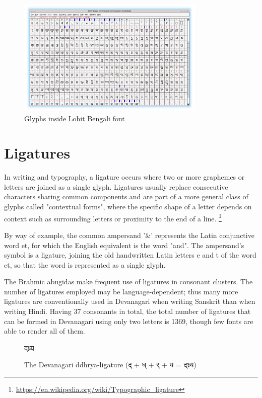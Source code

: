 \begin{figure}[h]
    \centering
    \includegraphics[width=0.8\textwidth]{images/glyph-fontforge-lohit-bengali.png}
    \caption{Glyphs inside Lohit Bengali font}
\end{figure}

\section{Ligatures }

In writing and typography, a ligature occurs where two or more graphemes or
letters are joined as a single glyph. Ligatures usually replace consecutive
characters sharing common components and are part of a more general class of
glyphs called "contextual forms", where the specific shape of a letter depends
on context such as surrounding letters or proximity to the end of a line.
\footnote{\url{https://en.wikipedia.org/wiki/Typographic_ligature}}

By way of example, the common ampersand '\&' represents the Latin conjunctive
word et, for which the English equivalent is the word "and". The ampersand's
symbol is a ligature, joining the old handwritten Latin letters e and t of the
word et, so that the word is represented as a single glyph.

The Brahmic abugidas make frequent use of ligatures in consonant clusters. The
number of ligatures employed may be language-dependent; thus many more ligatures
are conventionally used in Devanagari when writing Sanskrit than when writing
Hindi. Having 37 consonants in total, the total number of ligatures that can be
formed in Devanagari using only two letters is 1369, though few fonts are able
to render all of them.

\begin{figure}[h]
   \centering
   {\hindi\textexample द्ध्र्य }
   \caption{The Devanagari ddhrya-ligature {\hindi (द् + ध् + र् + य = द्ध्र्य)
} }
\end{figure}


